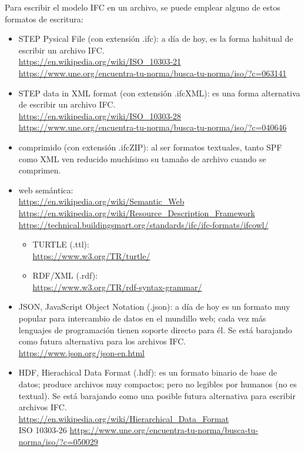 \documentclass[spanish,12pt,a4paper,final,oneside]{book}
\begin{document}
Para escribir el modelo IFC en un archivo, se puede emplear alguno de estos formatos de escritura:
\begin{itemize}

\item STEP Pysical File (con extensión .ifc): a día de hoy, es la forma habitual de escribir un archivo IFC. 
\\ \url{https://en.wikipedia.org/wiki/ISO_10303-21}
\\ \url{https://www.une.org/encuentra-tu-norma/busca-tu-norma/iso/?c=063141}

\item STEP data in XML format (con extensión .ifcXML): es una forma alternativa de escribir un archivo IFC.
\\ \url{https://en.wikipedia.org/wiki/ISO_10303-28}
\\ \url{https://www.une.org/encuentra-tu-norma/busca-tu-norma/iso/?c=040646}

\item comprimido (con extensión .ifcZIP): al ser formatos textuales, tanto SPF como XML ven reducido muchísimo su tamaño de archivo cuando se comprimen.

\item web semántica:
\\ \url{https://en.wikipedia.org/wiki/Semantic_Web}
\\ \url{https://en.wikipedia.org/wiki/Resource_Description_Framework}
\\ \url{https://technical.buildingsmart.org/standards/ifc/ifc-formats/ifcowl/}
\begin{itemize}
\item TURTLE (.ttl): 
\\ \url{https://www.w3.org/TR/turtle/}
\item RDF/XML (.rdf):
\\\url{https://www.w3.org/TR/rdf-syntax-grammar/}
\end{itemize}

\item JSON, JavaScript Object Notation (.json): a día de hoy es un formato muy popular para intercambio de datos en el mundillo web; cada vez más lenguajes de programación tienen soporte directo para él. Se está barajando como futura alternativa para los archivos IFC.
\\ \url{https://www.json.org/json-en.html}

\item HDF, Hierachical Data Format (.hdf): es un formato binario de base de datos; produce archivos muy compactos; pero no legibles por humanos (no es textual). Se está barajando como una posible futura alternativa para escribir  archivos IFC.
\\ \url{https://en.wikipedia.org/wiki/Hierarchical_Data_Format}
\\ ISO 10303-26 {\tiny \url{https://www.une.org/encuentra-tu-norma/busca-tu-norma/iso/?c=050029}}
\end{itemize}
\end{document}
